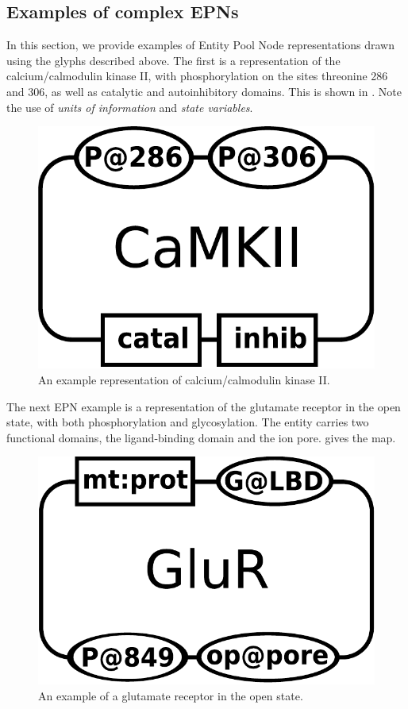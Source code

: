 
\subsection{Examples of complex EPNs}
\label{sec:CplxEPNs}

In this section, we provide examples of Entity Pool Node representations drawn using the \SBGNPDLone glyphs described above.  The first is a representation of the calcium/calmodulin kinase II, with phosphorylation on the sites threonine 286 and 306, as well as catalytic and autoinhibitory domains.  This is shown in .  Note the use of \emph{units of information} and \emph{state variables}.

\begin{figure}[H]
  \centering
  \includegraphics[scale = 0.3]{examples/macromolecule-CaMKII}
  \caption{An example representation of calcium/calmodulin kinase II.}
  \label{fig:example-camkii}
\end{figure}

The next EPN example is a representation of the glutamate receptor in the open state, with both phosphorylation and glycosylation.  The entity carries two functional domains, the ligand-binding domain and the ion pore.   gives the map.

\begin{figure}[H]
  \centering
  \includegraphics[scale = 0.3]{examples/macromolecule-GluR}
  \caption{An example of a glutamate receptor in the open state.}
  \label{fig:example-glur}
\end{figure}




